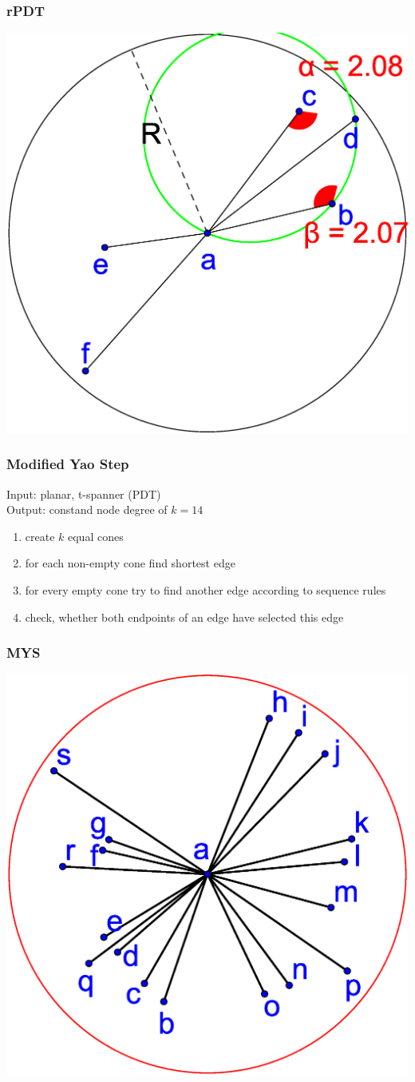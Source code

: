 \documentclass[compress]{beamer}
\begin{document}
\begin{frame}
\frametitle{rPDT}
\center \includegraphics[width=0.7\linewidth]{PDT_angle.eps}
\end{frame}

\begin{frame}
\frametitle{Modified Yao Step}
Input: planar, t-spanner (PDT)\\
Output: constand node degree of $k = 14 $
	\begin{enumerate}
		\item create $k $ equal cones
		\item for each non-empty cone find shortest edge
		\item for every empty cone try to find another edge according to sequence rules
		\item check, whether both endpoints of an edge have selected this edge
	\end{enumerate}
\end{frame}

\begin{frame} 
\frametitle{MYS}
	\center \includegraphics[width=0.65\linewidth]{RMYS_0.eps}
\end{frame}
\end{document}
